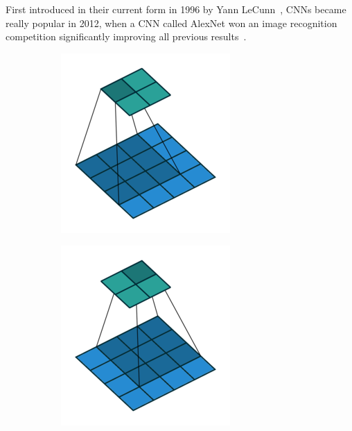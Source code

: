 First introduced in their current form in 1996 by Yann LeCunn~\cite{lecun}, CNNs became really popular in 2012, when a CNN called AlexNet won an image recognition competition significantly improving all previous results~\cite{alexnet}. 


\begin{figure}[h]
  \begin{subfigure}[b]{0.24\textwidth}
    \includegraphics[width=\textwidth]{figures/no_padding_no_strides_00}
  \end{subfigure}
  \begin{subfigure}[b]{0.24\textwidth}
    \includegraphics[width=\textwidth]{figures/no_padding_no_strides_01}

\end{subfigure}
\end{figure}
